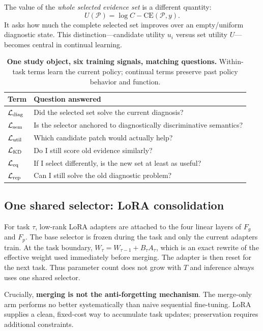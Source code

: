 \documentclass{article}
\def\L{{\cal L}}
\newcommand{\Fg}{F_g}
\newcommand{\Fp}{F_p}
\newcommand{\Psel}{\mathcal{P}}
\begin{document}
The value of the \emph{whole selected evidence set} is a different quantity:
\begin{equation}
U(\Psel)
=
\log C-\mathrm{CE}(\Psel,y).
\label{eq:bigU}
\end{equation}
It asks how much the complete selected set improves over an empty/uniform diagnostic state.
This distinction---candidate utility $u_i$ versus set utility $U$---becomes central in continual learning.

\begin{table}[t]
\centering
\footnotesize
\caption{\textbf{One study object, six training signals, matching questions.}
Within-task terms learn the current policy; continual terms preserve past policy behavior and function.}
\label{tab:questions}
\begin{tabular}{p{1.25cm}p{4.75cm}}
\toprule
Term & Question answered \\
\midrule
$\L_{\rm diag}$ & Did the selected set solve the current diagnosis? \\
$\L_{\rm sem}$ & Is the selector anchored to diagnostically discriminative semantics? \\
$\L_{\rm util}$ & Which candidate patch would actually help? \\
\midrule
$\L_{\rm KD}$ & Do I still score old evidence similarly? \\
$\L_{\rm eq}$ & If I select differently, is the new set at least as useful? \\
$\L_{\rm rep}$ & Can I still solve the old diagnostic problem? \\
\bottomrule
\end{tabular}
\end{table}

\subsection{One shared selector: LoRA consolidation}
\label{ssec:lora}

For task $\tau$, low-rank LoRA adapters are attached to the four linear layers of $\Fg$ and $\Fp$.
The base selector is frozen during the task and only the current adapters train.
At the task boundary, $W_{\tau}=W_{\tau-1}+B_\tau A_\tau$, which is an exact rewrite of the effective weight used immediately before merging.
The adapter is then reset for the next task.
Thus parameter count does not grow with $T$ and inference always uses one shared selector.

Crucially, \textbf{merging is not the anti-forgetting mechanism}.
The merge-only arm performs no better systematically than naive sequential fine-tuning.
LoRA supplies a clean, fixed-cost way to accumulate task updates; preservation requires additional constraints.
\end{document}
